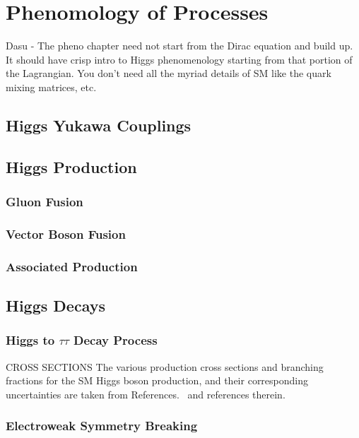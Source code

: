 \chapter{Phenomology of Processes}
\label{sec:pheno}

Dasu -
The pheno chapter need not start from the Dirac equation and build up. It should have crisp intro to Higgs phenomenology starting from that portion of the Lagrangian. You don’t need all the myriad details of SM like the quark mixing matrices, etc.

\section{Higgs Yukawa Couplings}

\section{Higgs Production}

\subsection{Gluon Fusion}

\subsection{Vector Boson Fusion}

\subsection{Associated Production}

\section{Higgs Decays}

\subsection{Higgs to $\tau\tau$ Decay Process}

CROSS SECTIONS
The various production cross sections and branching fractions for the SM Higgs 
boson production, and their corresponding uncertainties are taken from 
References.~\cite{deFlorian:2016spz,Denner:2011mq,Ball:2011mu} and references therein.



\subsection{Electroweak Symmetry Breaking}

